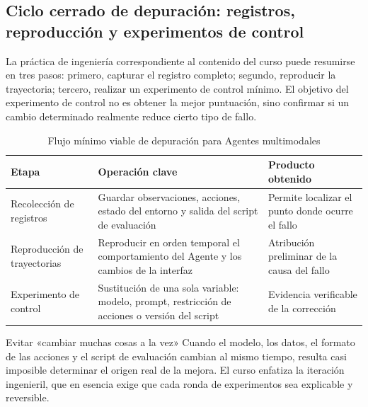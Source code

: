 \subsection{Ciclo cerrado de depuración: registros, reproducción y experimentos de control}
La práctica de ingeniería correspondiente al contenido del curso puede resumirse en tres pasos: primero, capturar el registro completo; segundo, reproducir la trayectoria; tercero, realizar un experimento de control mínimo. El objetivo del experimento de control no es obtener la mejor puntuación, sino confirmar si un cambio determinado realmente reduce cierto tipo de fallo.

\begin{table}[H]
\centering
\begin{tabular}{p{2.6cm}p{4.6cm}p{4.0cm}}
\toprule
\textbf{Etapa} & \textbf{Operación clave} & \textbf{Producto obtenido} \\
\midrule
Recolección de registros & Guardar observaciones, acciones, estado del entorno y salida del script de evaluación & Permite localizar el punto donde ocurre el fallo \\
Reproducción de trayectorias & Reproducir en orden temporal el comportamiento del Agente y los cambios de la interfaz & Atribución preliminar de la causa del fallo \\
Experimento de control & Sustitución de una sola variable: modelo, prompt, restricción de acciones o versión del script & Evidencia verificable de la corrección \\
\bottomrule
\end{tabular}
\caption{Flujo mínimo viable de depuración para Agentes multimodales}
\end{table}

\begin{warningbox}{Evitar «cambiar muchas cosas a la vez»}
Cuando el modelo, los datos, el formato de las acciones y el script de evaluación cambian al mismo tiempo, resulta casi imposible determinar el origen real de la mejora. El curso enfatiza la iteración ingenieril, que en esencia exige que cada ronda de experimentos sea explicable y reversible.
\end{warningbox}

